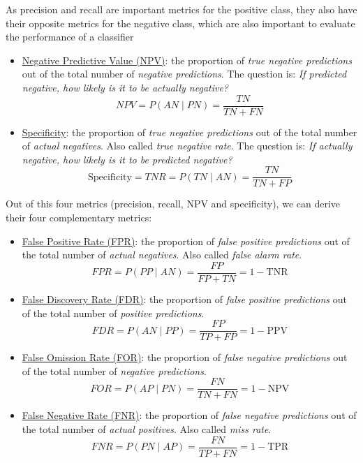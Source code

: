 As precision and recall are important metrics for the positive class, they also have their opposite metrics for the negative class, which are also important to evaluate the performance of a classifier
\begin{itemize}
    \item \ul{Negative Predictive Value (NPV)}: the proportion of \emph{true negative predictions} out of the {total} number of \emph{negative predictions}. The question is: \emph{If predicted negative, how likely is it to be actually negative?}
    \begin{equation} \label{label:npv}
        NPV = P(AN \mid PN) = \frac{TN}{TN + FN}
    \end{equation}
    \item \ul{Specificity}: the proportion of \emph{true negative predictions} out of the {total} number of \emph{actual negatives}. Also called \emph{true negative rate}. The question is: \emph{If actually negative, how likely is it to be predicted negative?}
    \begin{equation} \label{label:specificity}
        \text{Specificity} = TNR = P(TN \mid AN) = \frac{TN}{TN + FP}
    \end{equation}
\end{itemize}

Out of this four metrics (precision, recall, NPV and specificity), we can derive their four complementary metrics:
\begin{itemize}
    \item \ul{False Positive Rate (FPR)}: the proportion of \emph{false positive predictions} out of the {total} number of \emph{actual negatives}. Also called \emph{false alarm rate}.
    \begin{equation} \label{label:fpr}
        FPR = P(PP \mid AN) = \frac{FP}{FP + TN} = 1 - \text{TNR}
    \end{equation}
    \item \ul{False Discovery Rate (FDR)}: the proportion of \emph{false positive predictions} out of the {total} number of \emph{positive predictions}.
    \begin{equation} \label{label:fdr}
        FDR = P(AN \mid PP) = \frac{FP}{TP + FP} = 1 - \text{PPV}
    \end{equation}
    \item \ul{False Omission Rate (FOR)}: the proportion of \emph{false negative predictions} out of the {total} number of \emph{negative predictions}.
    \begin{equation} \label{label:for}
        FOR = P(AP \mid PN) = \frac{FN}{TN + FN} = 1 - \text{NPV}
    \end{equation}
    \item \ul{False Negative Rate (FNR)}: the proportion of \emph{false negative predictions} out of the {total} number of \emph{actual positives}. Also called \emph{miss rate}.
    \begin{equation} \label{label:fnr}
        FNR = P(PN \mid AP) = \frac{FN}{TP + FN} = 1 - \text{TPR}
    \end{equation}
\end{itemize}


